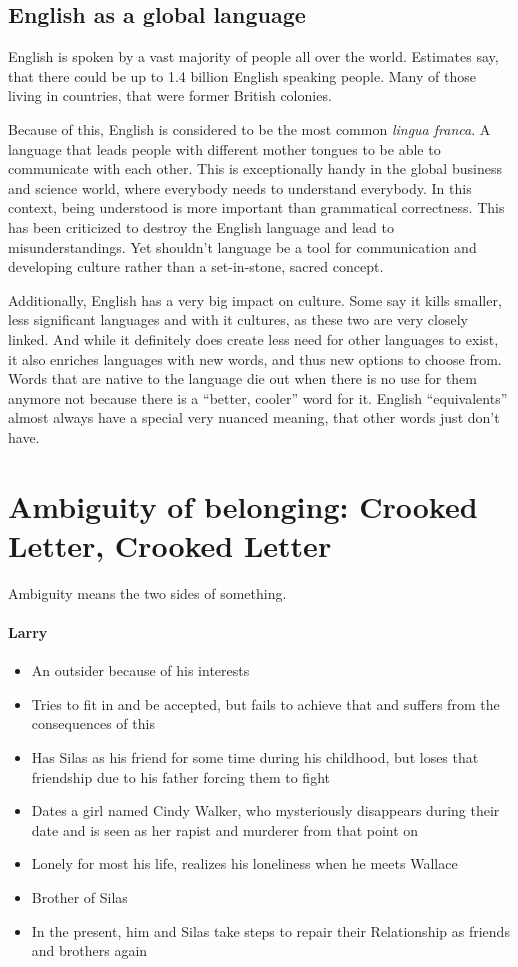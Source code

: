 \documentclass[10pt]{article}
\begin{document}
\subsection{English as a global language}
\label{sec:media/english}
English is spoken by a vast majority of people all over the world. Estimates say, that there
could be up to 1.4 billion English speaking people. Many of those living in countries, that
were former British colonies.

Because of this, English is considered to be the most common \textit{lingua franca}. A language
that leads people with different mother tongues to be able to communicate with each other.
This is exceptionally handy in the global business and science world, where everybody needs to understand
everybody. In this context, being understood is more important than grammatical correctness.
This has been criticized to destroy the English language and lead to misunderstandings.
Yet shouldn't language be a tool for communication and developing culture rather than a
set-in-stone, sacred concept.

Additionally, English has a very big impact on culture. Some say it kills smaller, less significant languages
and with it cultures, as these two are very closely linked.
And while it definitely does create less need for other languages to exist, it also enriches languages with
new words, and thus new options to choose from. Words that are native to the language die out when there is no
use for them anymore not because there is a \enquote{better, cooler} word for it. English \enquote{equivalents}
almost always have a special very nuanced meaning, that other words just don't have.
\section{Ambiguity of belonging: Crooked Letter, Crooked Letter}
\label{sec:crookedl}
\begin{definition}
Ambiguity means the two sides of something.
\end{definition}

\paragraph{Larry}
\begin{itemize}
\item An outsider because of his interests
\item Tries to fit in and be accepted, but fails to achieve that and suffers from the consequences of this
\item Has Silas as his friend for some time during his childhood, but loses that friendship due to his father forcing them to fight
\item Dates a girl named Cindy Walker, who mysteriously disappears during their date and is seen as her rapist and murderer from that point on
\item Lonely for most his life, realizes his loneliness when he meets Wallace
\item Brother of Silas
\item In the present, him and Silas take steps to repair their Relationship as friends and brothers again
\end{itemize}
\end{document}
